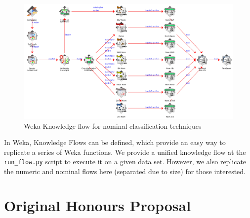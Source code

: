 \begin{landscape}
\begin{figure}[H]
\centering
\includegraphics[width=\linewidth]{../diagrams/knowledgeflow-nominal.png}
\caption{Weka Knowledge flow for nominal classification techniques}
\end{figure}

In Weka, Knowledge Flows can be defined, which provide an easy way to replicate a series of Weka functions. We provide a unified knowledge flow at the \texttt{run\_flow.py} script to execute it on a given data set. However, we also replicate the numeric and nominal flows here (separated due to size) for those interested.
\end{landscape}

\chapter{Original Honours Proposal}
